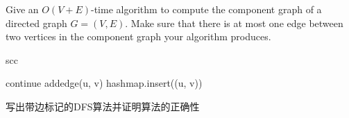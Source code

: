 \documentclass[a4paper, justified]{tufte-handout}
\begin{document}
\begin{problem}[TC 22.5-5]
Give an $O(V+E)$-time algorithm to compute the component graph of a directed graph $G=(V,E)$. Make sure that there is at most one edge between two vertices in the component graph your algorithm produces.
\end{problem}

\begin{solution}

\noindent
\begin{algorithm}
\caption{scc}\label{euclid}
\begin{algorithmic}[1]
				\State continue
			\EndIf
			\State addedge(u, v)
			\State hashmap.insert((u, v))
		\EndIf
	\EndFor
\EndFor
\EndProcedure
\end{algorithmic}
\end{algorithm}
\end{solution}


\beginoptional

\begin{problem}[TC 22.5-7]
\end{problem}

\begin{solution}
\end{solution}


\beginot
\begin{ot}
	
\end{ot}


\begin{ot}[带边标记的DFS算法]
	写出带边标记的DFS算法并证明算法的正确性
\end{ot}

\end{document}
